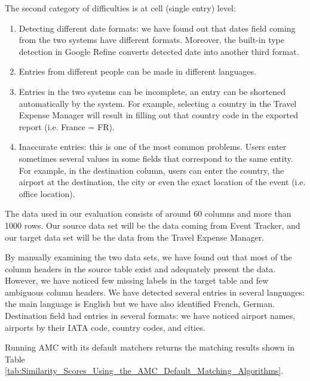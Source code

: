 The second category of difficulties is at cell (single entry) level:

\begin{enumerate}
\item  Detecting different date formats: we have found out that dates field coming from the two systems have different formats. Moreover, the built-in type detection in Google Refine converts detected date into another third format.

\item  Entries from different people can be made in different languages.

\item  Entries in the two systems can be incomplete, an entry can be shortened automatically by the system. For example, selecting a country in the Travel Expense Manager will result in filling out that country code in the exported report (i.e. France = FR).

\item  Inaccurate entries: this is one of the most common problems. Users enter sometimes several values in some fields that correspond to the same entity. For example, in the destination column, users can enter the country, the airport at the destination, the city or even the exact location of the event (i.e. office location).
\end{enumerate}

The data used in our evaluation consists of around 60 columns and more than 1000 rows. Our source data set will be the data coming from Event Tracker, and our target data set will be the data from the Travel Expense Manager.

By manually examining the two data sets, we have found out that most of the column headers in the source table exist and adequately present the data. However, we have noticed few missing labels in the target table and few ambiguous column headers. We have detected several entries in several languages: the main language is English but we have also identified French, German. Destination field had entries in several formats: we have noticed airport names, airports by their IATA code, country codes, and cities.

Running AMC with its default matchers returns the matching results shown in Table \ref{tab:Similarity_Scores_Using_the_AMC_Default_Matching_Algorithms}.

